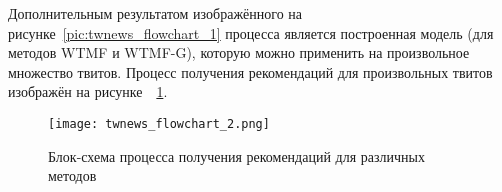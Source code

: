     Дополнительным результатом изображённого на рисунке~\ref{pic:twnews_flowchart_1} процесса является построенная модель (для методов WTMF и WTMF-G), которую можно применить на произвольное множество твитов. Процесс получения рекомендаций для произвольных твитов изображён на рисунке~~\ref{pic:twnews_flowchart_2}.
    
    \begin{figure}[h!]
            \center
            \texttt{[image: twnews\_flowchart\_2.png]}
            \caption{Блок-схема процесса получения рекомендаций для различных методов}
            \label{pic:twnews_flowchart_2}
    \end{figure}


    \clearpage



